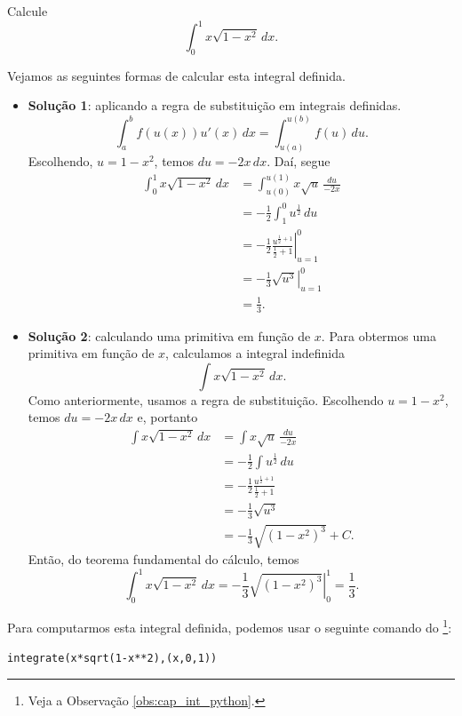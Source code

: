 \begin{exeresol}
  Calcule
  \begin{equation}
    \int_0^1x\sqrt{1-x^2}\,dx.
  \end{equation}
\end{exeresol}
\begin{resol}
  Vejamos as seguintes formas de calcular esta integral definida.
  \begin{itemize}
  \item {\bf Solução 1}: aplicando a regra de substituição em integrais definidas.
    \begin{equation}
      \int_a^bf(u(x))u'(x)\,dx = \int_{u(a)}^{u(b)} f(u)\,du.
    \end{equation}
    Escolhendo, $u = 1-x^2$, temos $du = -2x\,dx$. Daí, segue
    \begin{align}
      \int_0^1x\sqrt{1-x^2}\,dx &= \int_{u(0)}^{u(1)}x\sqrt{u}\,\frac{du}{-2x}\\
                                &= -\frac{1}{2}\int_{1}^0 u^{\frac{1}{2}}\,du\\
                                &= -\frac{1}{2}\left.\frac{u^{\frac{1}{2}+1}}{\frac{1}{2}+1}\right|_{u=1}^0\\
                                &= -\frac{1}{3}\left.\sqrt{u^3}\right|_{u=1}^0\\
                                &= \frac{1}{3}.
    \end{align}
  \item {\bf Solução 2}: calculando uma primitiva em função de $x$.
    Para obtermos uma primitiva em função de $x$, calculamos a integral indefinida
    \begin{equation}
      \int x\sqrt{1-x^2}\,dx.
    \end{equation}
    Como anteriormente, usamos a regra de substituição. Escolhendo $u=1-x^2$, temos $du = -2x\,dx$ e, portanto
    \begin{align}
      \int x\sqrt{1-x^2}\,dx &= \int x\sqrt{u}\,\frac{du}{-2x}\\
                             &= -\frac{1}{2}\int u^{\frac{1}{2}}\,du\\
                             &= -\frac{1}{2}\frac{u^{\frac{1}{2}+1}}{\frac{1}{2}+1}\\
                             &= -\frac{1}{3}\sqrt{u^3}\\
                             &= -\frac{1}{3}\sqrt{(1-x^2)^3} + C.
    \end{align}
    Então, do teorema fundamental do cálculo, temos
    \begin{equation}
      \int_0^1 x\sqrt{1-x^2}\,dx = -\frac{1}{3}\left.\sqrt{(1-x^2)^3}\right|_{0}^1 = \frac{1}{3}.
    \end{equation}
  \end{itemize}

  \ifispython
  Para computarmos esta integral definida, podemos usar o seguinte comando do \sympy\footnote{Veja a Observação \ref{obs:cap_int_python}.}:
\begin{verbatim}
integrate(x*sqrt(1-x**2),(x,0,1))
\end{verbatim}
  \fi
\end{resol}


